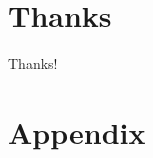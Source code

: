 \documentclass[aspectratio=169]{beamer}
\begin{document}
\section*{Thanks}

\begin{frame}
    Thanks!
\end{frame}


\appendix

\renewcommand\thetable{\thesection.\arabic{table}} 
\renewcommand\thefigure{\thesection.\arabic{figure}} 
\setcounter{table}{0}
\setcounter{figure}{0}

\section{Appendix}
\end{document}
